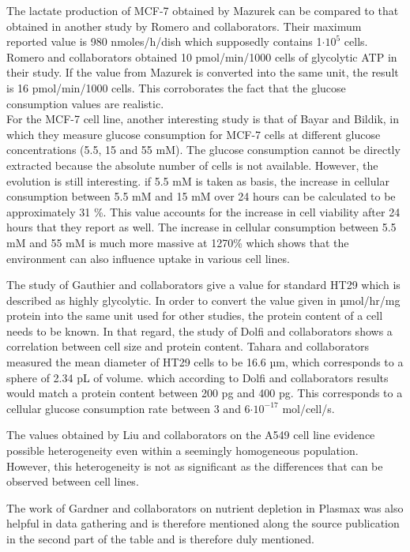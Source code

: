 \documentclass[11pt,a4paper]{article}
\begin{document}
The lactate production of MCF-7 obtained by Mazurek can be compared to that obtained in  another study by Romero and collaborators. Their maximum reported value is 980 nmoles/h/dish which supposedly contains 1$\cdot 10^{5}$ cells. Romero and collaborators obtained 10 pmol/min/1000 cells of glycolytic ATP in their study.\cite{RomeroAgilent} If the value from Mazurek is converted into the same unit, the result is 16 pmol/min/1000 cells. This corroborates the fact that the glucose consumption values are realistic.\\

For the MCF-7 cell line, another interesting study is that of Bayar and Bildik, in which they measure glucose consumption for MCF-7 cells at different glucose concentrations (5.5, 15 and 55 mM). The glucose consumption cannot be directly extracted because the absolute number of cells is not available. However, the evolution is still interesting. if 5.5 mM is taken as basis, the increase in cellular consumption between 5.5 mM and 15 mM over 24 hours can be calculated to be approximately 31 \%. This value accounts for the increase in cell viability after 24 hours that they report as well. The increase in cellular consumption between 5.5 mM and 55 mM is much more massive at 1270\% which shows that the environment can also influence uptake in various cell lines.\cite{Bayar2021}

The study of Gauthier and collaborators give a value for standard HT29 which is described as highly glycolytic. In order to convert the value given in µmol/hr/mg protein into the same unit used for other studies, the protein content of a cell needs to be known. In that regard, the study of Dolfi and collaborators shows a correlation between cell size and protein content.\cite{Dolfi2013} Tahara and collaborators measured the mean diameter of HT29 cells to be 16.6 µm, which corresponds to a sphere of 2.34 pL of volume.\cite{Tahara2013} which according to Dolfi and collaborators results would match a protein content between 200 pg and 400 pg. This corresponds to a cellular glucose consumption rate between 3 and 6$ \cdot 10^{-17}$ mol/cell/s.

The values obtained by Liu and collaborators on the A549 cell line evidence possible heterogeneity even within a seemingly homogeneous population. However, this heterogeneity is not as significant as the differences that can be observed between cell lines.\cite{Liu2013}
 
The work of Gardner and collaborators on nutrient depletion in Plasmax was also helpful in data gathering and is therefore mentioned along the source publication in the second part of the table and is therefore duly mentioned.\cite{Gardner2022}
\end{document}

